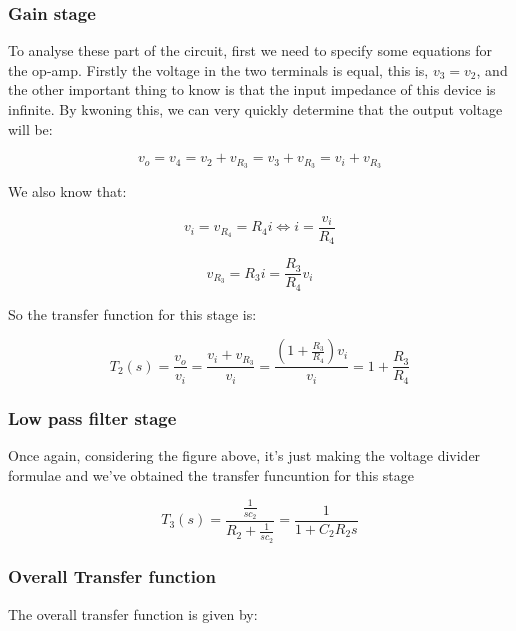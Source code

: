 \subsubsection{Gain stage}

To analyse these part of the circuit, first we need to specify some equations for the op-amp. 
Firstly the voltage in the two terminals is equal, this is, $v_3 = v_2$, and the other important thing to know is that the input impedance of this device is infinite. By kwoning this, we can very quickly determine that the output voltage will be:

\begin{equation}
v_o = v_4 = v_2 + v_{R_3} = v_3 + v_{R_3} = v_i + v_{R_3}
\end{equation} 

We also know that:

\begin{equation}
v_i = v_{R_4} = R_4i \iff i = \frac{v_i}{R_4}
\end{equation}

\begin{equation}
v_{R_3} = R_3i = \frac{R_3}{R_4}v_i
\end{equation}

So the transfer function for this stage is:

\begin{equation}
T_2(s) = \frac{v_o}{v_i} = \frac{v_i + v_{R_3}}{v_i} = \frac{(1+\frac{R_3}{R_4})v_i}{v_i} = 1 + \frac{R_3}{R_4}
\end{equation} 

\subsubsection{Low pass filter stage}

Once again, considering the figure above, it's just making the voltage divider formulae and we've obtained the transfer funcuntion for this stage

\begin{equation}
T_3(s) = \frac{\frac{1}{sc_2}}{R_2 + \frac{1}{sc_2}} = \frac{1}{1+ C_2R_2s}
\end{equation} 

\subsubsection{Overall Transfer function}

The overall transfer function is given by:

